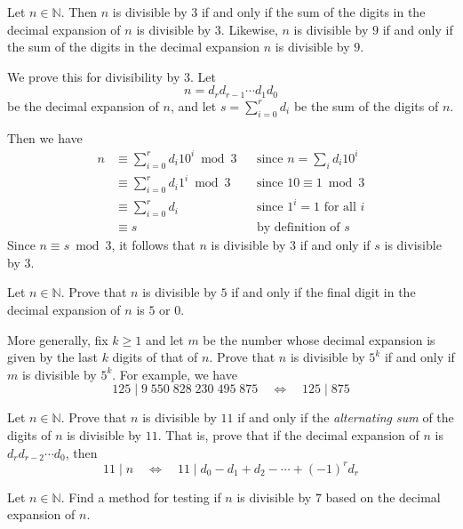 \begin{example}
Let $n \in \mathbb{N}$. Then $n$ is divisible by $3$ if and only if the sum of the digits in the decimal expansion of $n$ is divisible by $3$. Likewise, $n$ is divisible by $9$ if and only if the sum of the digits in the decimal expansion $n$ is divisible by $9$.

We prove this for divisibility by $3$. Let
\[ n = d_r d_{r-1} \cdots d_1 d_0 \]
be the decimal expansion of $n$, and let $s = \sum_{i=0}^r d_i$ be the sum of the digits of $n$.

Then we have
\begin{align*}
n &\equiv \sum_{i=0}^r d_i 10^i \bmod 3 && \text{since $n=\sum_i d_i 10^i$} \\
&\equiv \sum_{i=0}^r d_i 1^i \bmod 3 && \text{since $10 \equiv 1 \bmod 3$} \\
&\equiv \sum_{i=0}^r d_i && \text{since $1^i=1$ for all $i$} \\
&\equiv s && \text{by definition of $s$}
\end{align*}
Since $n \equiv s \bmod 3$, it follows that $n$ is divisible by $3$ if and only if $s$ is divisible by $3$.
\end{example}

\begin{exercise}
Let $n \in \mathbb{N}$. Prove that $n$ is divisible by $5$ if and only if the final digit in the decimal expansion of $n$ is $5$ or $0$.

More generally, fix $k \ge 1$ and let $m$ be the number whose decimal expansion is given by the last $k$ digits of that of $n$. Prove that $n$ is divisible by $5^k$ if and only if $m$ is divisible by $5^k$. For example, we have
\[ 125 \mid 9\;550\;828\;230\;495\;875 \quad \Leftrightarrow \quad 125 \mid 875 \]
\end{exercise}

\begin{exercise}
Let $n \in \mathbb{N}$. Prove that $n$ is divisible by $11$ if and only if the \textit{alternating sum} of the digits of $n$ is divisible by $11$. That is, prove that if the decimal expansion of $n$ is $d_rd_{r-2} \cdots d_0$, then
\[ 11 \mid n \quad \Leftrightarrow \quad 11 \mid d_0 - d_1 + d_2 - \cdots + (-1)^rd_r \]
\end{exercise}

\begin{exercise}
Let $n \in \mathbb{N}$. Find a method for testing if $n$ is divisible by $7$ based on the decimal expansion of $n$.
\end{exercise}

